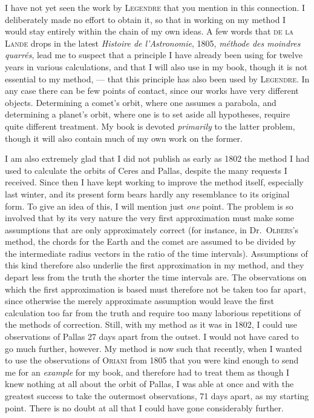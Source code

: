 \par\indent I have not yet seen the work by \textsc{Legendre} that you mention in this connection. I deliberately made no effort to obtain it, so that in working on my method I would stay entirely within the chain of my own ideas. A few words that \textsc{de la Lande} drops in the latest \emph{Histoire de l'Astronomie}, 1805, \emph{méthode des moindres quarrés}, lead me to suspect that a principle I have already been using for twelve years in various calculations, and that I will also use in my book, though it is not essential to my method, --- that this principle has also been used by \textsc{Legendre}. In any case there can be few points of contact, since our works have very different objects. Determining a comet’s orbit, where one assumes a parabola, and determining a planet’s orbit, where one is to set aside all hypotheses, require quite different treatment. My book is devoted \emph{primarily} to the latter problem, though it will also contain much of my own work on the former.

\par\indent I am also extremely glad that I did not publish as early as 1802 the method I had used to calculate the orbits of Ceres and Pallas, despite the many requests I received. Since then I have kept working to improve the method itself, especially last winter, and its present form bears hardly any resemblance to its original form. To give an idea of this, I will mention just \emph{one} point. The problem is so involved that by its very nature the very first approximation must make some assumptions that are only approximately correct (for instance, in Dr.~\textsc{Olbers}’s method, the chords for the Earth and the comet are assumed to be divided by the intermediate radius vectors in the ratio of the time intervals). Assumptions of this kind therefore also underlie the first approximation in my method, and they depart less from the truth the shorter the time intervals are. The observations on which the first approximation is based must therefore not be taken too far apart, since otherwise the merely approximate assumption would leave the first calculation too far from the truth and require too many laborious repetitions of the methods of correction. Still, with my method as it was in 1802, I could use observations of Pallas 27 days apart from the outset. I would not have cared to go much further, however. My method is now such that recently, when I wanted to use the observations of \textsc{Oriani} from 1805 that you were kind enough to send me for an
%
\emph{example} for my book, and therefore had to treat them as though I knew nothing at all about the orbit of Pallas, I was able at once and with the greatest success to take the outermost observations, 71 days apart, as my starting point. There is no doubt at all that I could have gone considerably further.

